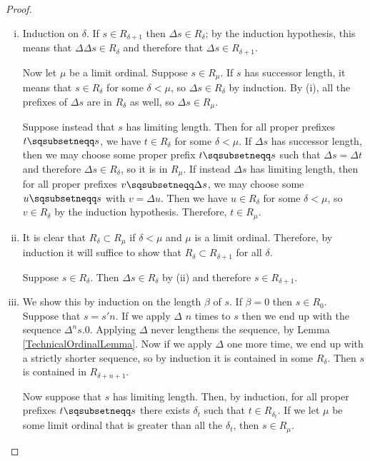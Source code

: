 \documentclass[11pt]{article} %
\begin{document}
\begin{proposition}
\begin{proof}
\begin{enumerate}[(i): ]
      \item Induction on $\delta$.  If $s\in R_{\delta+1}$ then $\Delta s\in R_\delta$; by the induction hypothesis, this means that $\Delta\Delta s\in R_\delta$ and therefore that $\Delta s\in R_{\delta+1}$.  

        Now let $\mu$ be a limit ordinal.  Suppose $s\in R_\mu$.  If $s$ has successor length, it means that $s\in R_\delta$ for some $\delta<\mu$, so $\Delta s\in R_\delta$ by induction.  By (i), all the prefixes of $\Delta s$ are in $R_\delta$ as well, so $\Delta s\in R_\mu$.  

        Suppose instead that $s$ has limiting length.  Then for all proper prefixes $t\pprefix s$, we have $t\in R_\delta$ for some $\delta<\mu$.  If $\Delta s$ has successor length, then we may choose some proper prefix $t\pprefix s$ such that $\Delta s = \Delta t$ and therefore $\Delta s\in R_\delta$, so it is in $R_\mu$.  If instead $\Delta s$ has limiting length, then for all proper prefixes $v\pprefix\Delta s$, we may choose some $u\pprefix s$ with $v=\Delta u$.  Then we have $u\in R_\delta$ for some $\delta<\mu$, so $v\in R_\delta$ by the induction hypothesis.  Therefore, $t\in R_\mu$.  

      \item It is clear that $R_\delta\subset R_\mu$ if $\delta<\mu$ and $\mu$ is a limit ordinal.  Therefore, by induction it will suffice to show that $R_\delta\subset R_{\delta+1}$ for all $\delta$.  

        Suppose $s\in R_\delta$.  Then $\Delta s\in R_\delta$ by (ii) and therefore $s\in R_{\delta+1}$.  

      \item We show this by induction on the length $\beta$ of $s$.  If $\beta=0$ then $s\in R_0$.  Suppose that $s=s'n$.  If we apply $\Delta$ $n$ times to $s$ then we end up with the sequence $\Delta^ns .0$.  Applying $\Delta$ never lengthens the sequence, by Lemma \ref{TechnicalOrdinalLemma}.  Now if we apply $\Delta$ one more time, we end up with a strictly shorter sequence, so by induction it is contained in some $R_\delta$.  Then $s$ is contained in $R_{\delta+n+1}$.  

        Now suppose that $s$ has limiting length.  Then, by induction, for all proper prefixes $t\pprefix s$ there exists $\delta_t$ such that $t\in R_{\delta_t}$.  If we let $\mu$ be some limit ordinal that is greater than all the $\delta_t$, then $s\in R_\mu$.  \qedhere
    \end{enumerate}
  \end{proof}
\end{proposition}
\end{document}
